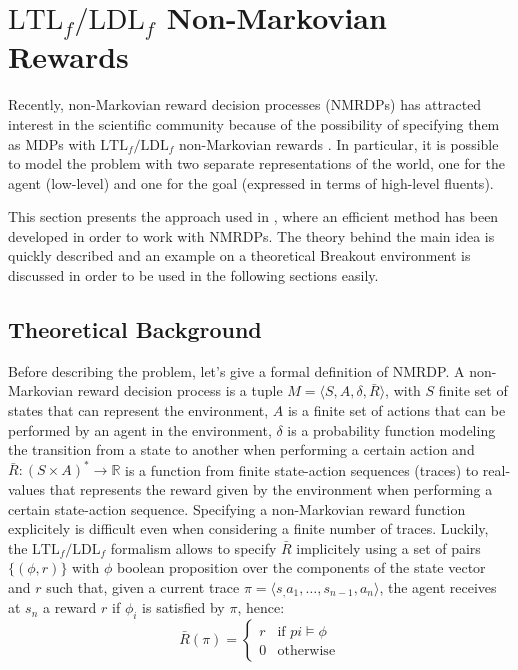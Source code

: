\section{$\text{LTL}_f/\text{LDL}_f$ Non-Markovian Rewards}
Recently, non-Markovian reward decision processes (NMRDPs)
has attracted interest in the scientific community because of the possibility
of specifying them as MDPs with $\text{LTL}_f/\text{LDL}_f$ non-Markovian
rewards \cite{DBLP:journals/corr/abs-1807-06333}. In particular, it is possible
to model the problem with two separate representations of the world, one for
the agent (low-level) and one for the goal (expressed in terms of high-level
fluents).

This section presents the approach used in
\cite{DBLP:journals/corr/abs-1807-06333}, where an efficient method has been
developed in order to work with NMRDPs. The theory behind the main idea is
quickly described and an example on a theoretical Breakout environment is
discussed in order to be used in the following sections easily.

\subsection{Theoretical Background}
Before describing the problem, let's give a formal definition of NMRDP.
A non-Markovian reward decision process is a tuple $M = \langle S, A, \delta,
\bar{R} \rangle$, with $S$ finite set of states that can represent the
environment, $A$ is a finite set of actions that can be performed by an agent
in the environment, $\delta$ is a probability function modeling
the transition from a state to another when performing a certain action and
$\bar{R}: (S \times A)^* \rightarrow \mathbb{R}$ is a function from
finite state-action sequences (traces) to real-values that represents the
reward given by the environment when performing a certain state-action
sequence. Specifying a non-Markovian reward function explicitely is
difficult even when considering a finite number of traces. Luckily, the
$\text{LTL}_f/\text{LDL}_f$ formalism allows to specify $\bar{R}$
implicitely using a set of pairs $\{ (\phi, r) \}$ with $\phi$ boolean
proposition over the components of the state vector and $r$ such that,
given a current trace $\pi = \langle s_, a_1, \dots, s_{n-1}, a_n \rangle$,
the agent receives at $s_n$ a reward $r$ if $\phi_i$ is satisfied by $\pi$,
hence:
\begin{equation}
    \bar{R}(\pi) =
        \begin{cases}
            r & \text{if } pi \vDash \phi \\
            0 & \text{otherwise}
        \end{cases}
\end{equation}


